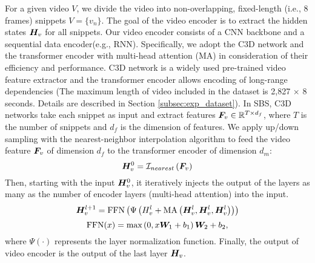 For a given video $V$, we divide the video into non-overlapping, fixed-length (i.e., 8 frames) snippets $V=\{v_n\}$.
The goal of the video encoder is to extract the hidden states $\bm{H}_v$ for all snippets.
Our video encoder consists of a CNN backbone and a sequential data encoder(e.g., RNN).
Specifically, we adopt the C3D network \cite{tran2015learning} and the transformer encoder \cite{vaswani2017attention} with multi-head attention (MA) in consideration of their efficiency and performance.
C3D network is a widely used pre-trained video feature extractor and the transformer encoder allows encoding of long-range dependencies (The maximum length of video included in the dataset is 2,827 $\times$ 8 seconds. Details are described in Section \ref{subsec:exp_dataset}).
In SBS, C3D networks take each snippet as input and extract features $\bm{F}_v \in \mathbb{R}^{T \times d_f}$, where $T$ is the number of snippets and $d_f$ is the dimension of features.
We apply up/down sampling with the nearest-neighbor interpolation algorithm to feed the video feature $\bm{F}_v$ of dimension $d_f$ to the transformer encoder of dimension $d_m$:
\begin{equation}
  \bm{H}_v^0 = \mathcal{I}_{nearest} \left( \bm{F}_v \right)
  \label{eq:linear_transformation}
\end{equation}
Then, starting with the input $\bm{H}_v^0$, it iteratively injects the output of the layers as many as the number of encoder layers (multi-head attention) into the input.
\begin{equation}
  \bm{H}_v^{l+1} = \text{FFN}\left(\Psi \left(H_v^l + \text{MA}\left( \bm{H}_v^l, \bm{H}_v^l, \bm{H}_v^l \right) \right)\right)
  \label{eq:video_encoder_self_attention}
\end{equation}
\begin{equation}
  \text{FFN}(x) = \text{max} \left(0, x\bm{W}_1 + b_1 \right)\bm{W}_2 + b_2,
  \label{eq:video_encoder_feed_forward}
\end{equation}
where $\Psi\left(\cdot\right)$ represents the layer normalization function.
Finally, the output of video encoder is the output of the last layer $\bm{H}_v$.

